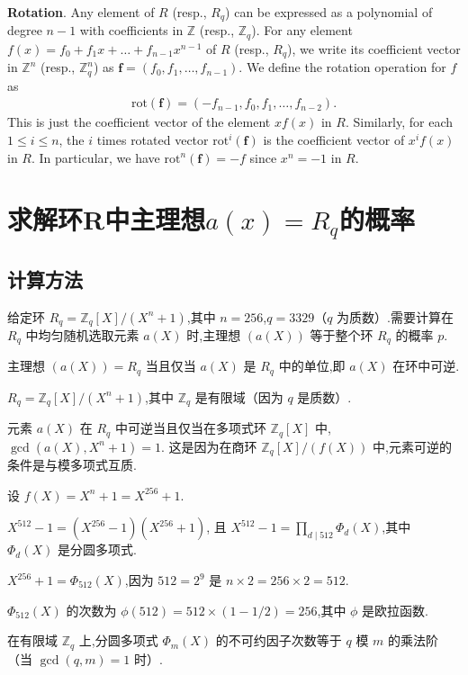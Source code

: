 \documentclass[12pt,a4paper]{article}
\numberwithin{equation}{section}
\begin{document}
\textbf{Rotation}. Any element of $R$ (resp., $R_q$) can be expressed as a polynomial of degree $n - 1$ with coefficients in $\mathbb{Z}$ (resp., $\mathbb{Z}_q$). For any element $f(x) = f_0 + f_1x + \ldots + f_{n-1}x^{n-1}$ of $R$ (resp., $R_q$), we write its coefficient vector in $\mathbb{Z}^n$ (resp., $\mathbb{Z}^n_q$) as $\mathbf{f} = (f_0, f_1, \ldots , f_{n-1})$. We define the rotation operation for $f$ as  
\begin{align*}
    \mathrm{rot}(\mathbf{f}) = (-f_{n-1}, f_0, f_1, \ldots , f_{n-2}).
\end{align*}
This is just the coefficient vector of the element $xf (x)$ in $R$. Similarly, for each $1 \leq i \leq  n$, the $i$ times rotated vector $\mathrm{rot}^i(\mathbf{f})$ is the coefficient vector of $x^if(x)$ in $R$. 
In particular, we have $\mathrm{rot}^n(\mathbf{f}) = -f$ since $x^n = -1$ in $R$.

\section[求解环R中主理想a(x)=Rq的概率]{求解环R中主理想$a(x)=R_q$的概率}
\subsection{计算方法}

给定环 $R_q = \mathbb{Z}_q[X]/(X^n + 1)$,其中 $n = 256$,$q = 3329$（$q$ 为质数）.需要计算在 $R_q$ 中均匀随机选取元素 $a(X)$ 时,主理想 $(a(X))$ 等于整个环 $R_q$ 的概率 $p$.

主理想 $(a(X)) = R_q$ 当且仅当 $a(X)$ 是 $R_q$ 中的单位,即 $a(X)$ 在环中可逆.

$R_q = \mathbb{Z}_q[X]/(X^n + 1)$,其中 $\mathbb{Z}_q$ 是有限域（因为 $q$ 是质数）.

元素 $a(X)$ 在 $R_q$ 中可逆当且仅当在多项式环 $\mathbb{Z}_q[X]$ 中,$\gcd(a(X), X^n + 1) = 1$.
这是因为在商环 $\mathbb{Z}_q[X]/(f(X))$ 中,元素可逆的条件是与模多项式互质.

设 $f(X) = X^n + 1 = X^{256} + 1$.

$X^{512} - 1 = (X^{256} - 1)(X^{256} + 1)$,
且 $X^{512} - 1 = \prod_{d \mid 512} \Phi_d(X)$,其中 $\Phi_d(X)$ 是分圆多项式.

$X^{256} + 1 = \Phi_{512}(X)$,因为 $512 = 2^9$ 是 $n \times 2 = 256 \times 2 = 512$.

$\Phi_{512}(X)$ 的次数为 $\phi(512) = 512 \times (1 - 1/2) = 256$,其中 $\phi$ 是欧拉函数.

在有限域 $\mathbb{Z}_q$ 上,分圆多项式 $\Phi_m(X)$ 的不可约因子次数等于 $q$ 模 $m$ 的乘法阶（当 $\gcd(q, m) = 1$ 时）.
\end{document}

